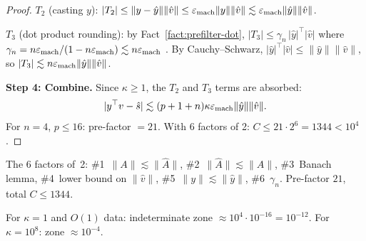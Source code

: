 \begin{proof}
\emph{$T_2$} (casting $y$):
$|T_2| \le \|y - \hat{y}\|\|\hat{v}\|
\le \varepsilon_{\mathrm{mach}}\|y\|\|\hat{v}\|
\lesssim \varepsilon_{\mathrm{mach}}\|\hat{y}\|\|\hat{v}\|$.

\emph{$T_3$} (dot product rounding):
by Fact~\ref{fact:prefilter-dot},
$|T_3| \le \gamma_n\, |\hat{y}|^\top|\hat{v}|$
where $\gamma_n = n\varepsilon_{\mathrm{mach}}/(1 - n\varepsilon_{\mathrm{mach}}) \lesssim n\varepsilon_{\mathrm{mach}}$
\quad[$\lesssim$ \#6].
By Cauchy--Schwarz, $|\hat{y}|^\top|\hat{v}| \le \|\hat{y}\|\|\hat{v}\|$,
so $|T_3| \lesssim n\varepsilon_{\mathrm{mach}}\|\hat{y}\|\|\hat{v}\|$.

\medskip\noindent\textbf{Step 4: Combine.}
Since $\kappa \ge 1$, the $T_2$ and $T_3$ terms
are absorbed:
\[
  |y^\top v - \hat{s}|
  \lesssim (p + 1 + n)\kappa\varepsilon_{\mathrm{mach}}\|\hat{y}\|\|\hat{v}\|.
\]
For $n = 4$, $p \le 16$: pre-factor $= 21$.
With 6 factors of 2: $C \le 21 \cdot 2^6 = 1344 < 10^4$.
\end{proof}

\begin{remark}\label{rem:prefilter-constants}
The 6 factors of~2:
\#1~$\|A\| \lesssim \|\hat{A}\|$,
\#2~$\|\hat{A}\| \lesssim \|A\|$,
\#3~Banach lemma,
\#4~lower bound on $\|\hat{v}\|$,
\#5~$\|y\| \lesssim \|\hat{y}\|$,
\#6~$\gamma_n$.
Pre-factor $21$, total $C \le 1344$.

For $\kappa = 1$ and $O(1)$ data:
indeterminate zone $\approx 10^4 \cdot 10^{-16} = 10^{-12}$.
For $\kappa = 10^8$: zone $\approx 10^{-4}$.
\end{remark}

